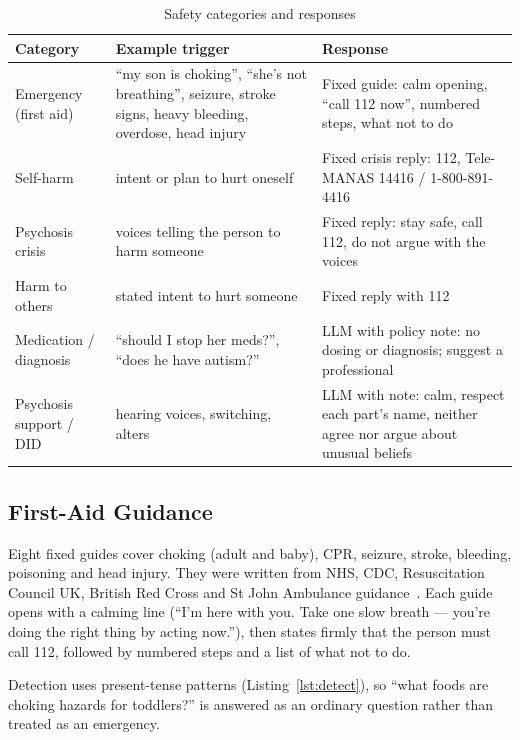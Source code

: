 \documentclass[11pt,a4paper]{article}
\begin{document}
\begin{table}[H]
\centering
\caption{Safety categories and responses}
\label{tab:safety}
\small
\begin{tabularx}{\textwidth}{@{}L{3.1cm}YL{5.3cm}@{}}
\toprule
\textbf{Category} & \textbf{Example trigger} & \textbf{Response}\\
\midrule
Emergency (first aid) & ``my son is choking'', ``she's not breathing'', seizure, stroke signs, heavy bleeding, overdose, head injury & Fixed guide: calm opening, ``call 112 now'', numbered steps, what not to do\\
Self-harm & intent or plan to hurt oneself & Fixed crisis reply: 112, Tele-MANAS 14416 / 1-800-891-4416\\
Psychosis crisis & voices telling the person to harm someone & Fixed reply: stay safe, call 112, do not argue with the voices\\
Harm to others & stated intent to hurt someone & Fixed reply with 112\\
Medication / diagnosis & ``should I stop her meds?'', ``does he have autism?'' & LLM with policy note: no dosing or diagnosis; suggest a professional\\
Psychosis support / DID & hearing voices, switching, alters & LLM with note: calm, respect each part's name, neither agree nor argue about unusual beliefs\\
\bottomrule
\end{tabularx}
\end{table}

\subsection{First-Aid Guidance}
Eight fixed guides cover choking (adult and baby), CPR, seizure, stroke, bleeding, poisoning and
head injury. They were written from NHS, CDC, Resuscitation Council UK, British Red Cross and St John
Ambulance guidance~\cite{nhs,cdc,resus,redcross}. Each guide opens with a calming line (``I'm here
with you. Take one slow breath --- you're doing the right thing by acting now.''), then states firmly that
the person must call 112, followed by numbered steps and a list of what not to do.

Detection uses present-tense patterns (Listing~\ref{lst:detect}), so ``what foods are choking
hazards for toddlers?'' is answered as an ordinary question rather than treated as an emergency.
\end{document}
